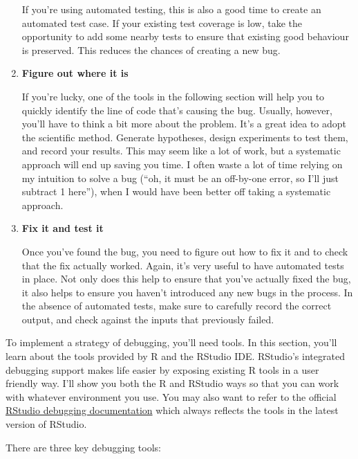 \begin{enumerate}
  If you're using automated testing, this is also a good time to create
  an automated test case. If your existing test coverage is low, take
  the opportunity to add some nearby tests to ensure that existing good
  behaviour is preserved. This reduces the chances of creating a new
  bug.
\item
  \textbf{Figure out where it is}

  If you're lucky, one of the tools in the following section will help
  you to quickly identify the line of code that's causing the bug.
  Usually, however, you'll have to think a bit more about the problem.
  It's a great idea to adopt the scientific method. Generate hypotheses,
  design experiments to test them, and record your results. This may
  seem like a lot of work, but a systematic approach will end up saving
  you time. I often waste a lot of time relying on my intuition to solve
  a bug (``oh, it must be an off-by-one error, so I'll just subtract 1
  here''), when I would have been better off taking a systematic
  approach.
\item
  \textbf{Fix it and test it}

  Once you've found the bug, you need to figure out how to fix it and to
  check that the fix actually worked. Again, it's very useful to have
  automated tests in place. Not only does this help to ensure that
  you've actually fixed the bug, it also helps to ensure you haven't
  introduced any new bugs in the process. In the absence of automated
  tests, make sure to carefully record the correct output, and check
  against the inputs that previously failed.
\end{enumerate}


To implement a strategy of debugging, you'll need tools. In this
section, you'll learn about the tools provided by R and the RStudio IDE.
RStudio's integrated debugging support makes life easier by exposing
existing R tools in a user friendly way. I'll show you both the R and
RStudio ways so that you can work with whatever environment you use. You
may also want to refer to the official
\href{http://www.rstudio.com/ide/docs/debugging/overview}{RStudio
debugging documentation} which always reflects the tools in the latest
version of RStudio.

There are three key debugging tools:

